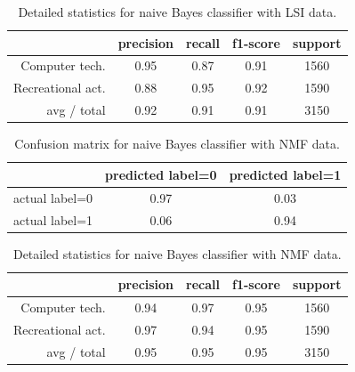 \documentclass[letterpaper]{article}
\begin{document}
\begin{table}[H]
\centering
\begin{tabular}{r|cccc}
 & precision & recall & f1-score & support \\ \hline
Computer tech. & 0.95 & 0.87 & 0.91 & 1560 \\
Recreational act. & 0.88 & 0.95 & 0.92 & 1590 \\
avg / total & 0.92 & 0.91 & 0.91 & 3150 \\
\end{tabular}
\caption{Detailed statistics for naive Bayes classifier with LSI data.}
\end{table}

\begin{table}[H]
\centering
\begin{tabular}{c|cc}
 & predicted label=0 & predicted label=1 \\ \hline
actual label=0 & 0.97 & 0.03 \\
actual label=1 & 0.06 & 0.94 \\
\end{tabular}
\caption{Confusion matrix for naive Bayes classifier with NMF data.}
\end{table}

\begin{table}[H]
\centering
\begin{tabular}{r|cccc}
 & precision & recall & f1-score & support \\ \hline
Computer tech. & 0.94 & 0.97 & 0.95 & 1560 \\
Recreational act. & 0.97 & 0.94 & 0.95 & 1590 \\
avg / total & 0.95 & 0.95 & 0.95 & 3150 \\
\end{tabular}
\caption{Detailed statistics for naive Bayes classifier with NMF data.}
\end{table}
\end{document}
